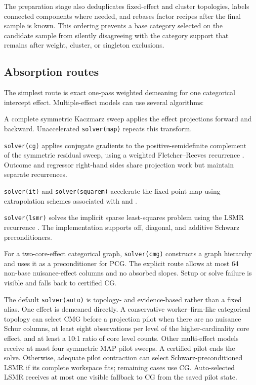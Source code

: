 \documentclass[11pt]{article}
\begin{document}
The preparation stage also deduplicates fixed-effect and cluster topologies,
labels connected components where needed, and rebases factor recipes after
the final sample is known.  This ordering prevents a base category selected
on the candidate sample from silently disagreeing with the category support
that remains after weight, cluster, or singleton exclusions.

\subsection{Absorption routes}
\label{sec:solvers}

The simplest route is exact one-pass weighted demeaning for one categorical
intercept effect.  Multiple-effect models can use several algorithms:

\begin{description}[style=nextline,leftmargin=1.5em]
\item[Symmetric MAP.]
A complete symmetric Kaczmarz sweep applies the effect projections forward
and backward.  Unaccelerated \texttt{solver(map)} repeats this transform.
\item[Conjugate-gradient acceleration.]
\texttt{solver(cg)} applies conjugate gradients to the positive-semidefinite
complement of the symmetric residual sweep, using a weighted
Fletcher--Reeves recurrence \citep{hestenes1952methods}.  Outcome and
regressor right-hand sides share projection work but maintain separate
recurrences.
\item[Irons--Tuck and SQUAREM.]
\texttt{solver(it)} and \texttt{solver(squarem)} accelerate the fixed-point
map using extrapolation schemes associated with \citet{irons1969version} and
\citet{varadhan2008squarem}.
\item[LSMR.]
\texttt{solver(lsmr)} solves the implicit sparse least-squares problem using
the LSMR recurrence \citep{fong2011lsmr}.  The implementation supports
off, diagonal, and additive Schwarz preconditioners.
\item[CMG-preconditioned graph solve.]
For a two-core-effect categorical graph, \texttt{solver(cmg)} constructs a
graph hierarchy and uses it as a preconditioner for PCG.  The explicit route
allows at most 64 non-base nuisance-effect columns and no absorbed slopes.
Setup or solve failure is visible and falls back to certified CG.
\end{description}

The default \texttt{solver(auto)} is topology- and evidence-based rather than
a fixed alias.  One effect is demeaned directly.  A conservative
worker--firm-like categorical topology can select CMG before a projection
pilot when there are no nuisance Schur columns, at least eight observations
per level of the higher-cardinality core effect, and at least a 10:1 ratio of
core level counts.  Other multi-effect models receive at most four symmetric
MAP pilot sweeps.  A certified pilot ends the solve.  Otherwise, adequate
pilot contraction can select Schwarz-preconditioned LSMR if its complete
workspace fits; remaining cases use CG.  Auto-selected LSMR receives at most
one visible fallback to CG from the saved pilot state.
\end{document}
